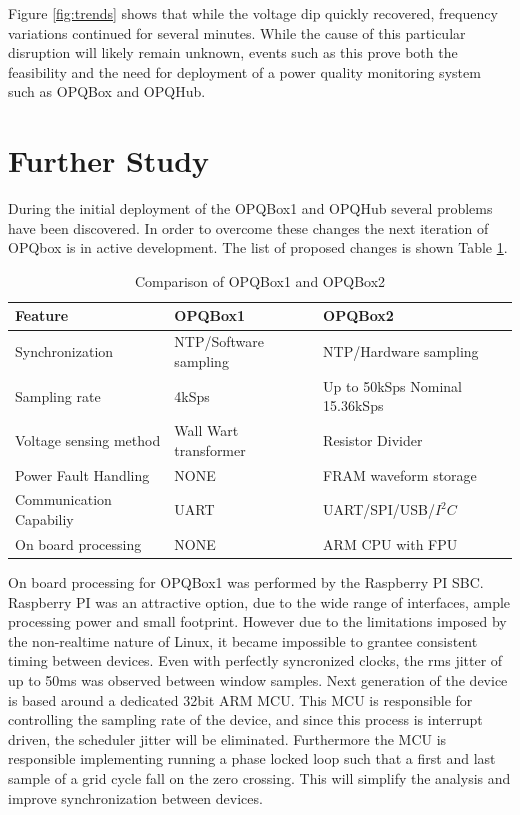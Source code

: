 Figure \ref{fig:trends} shows that while the voltage dip quickly recovered, frequency variations continued for several minutes. While the cause of this particular disruption will likely remain
unknown, events such as this prove both the feasibility and the need for deployment of a power quality monitoring system such as OPQBox and OPQHub.

\section{Further Study}\label{chap:further}

During the initial deployment of the OPQBox1 and OPQHub several problems have been discovered. In order to overcome these changes the next iteration of OPQbox is in active development.
The list of proposed  changes is shown Table \ref{tbl:comp}. 

\begin{table}[h!]
\caption{Comparison of OPQBox1 and OPQBox2}
\label{tbl:comp}
\begin{tabular}{|l|l|l|}
\hline
\textbf{Feature}        & \textbf{OPQBox1}               & \textbf{OPQBox2}                     \\ \hline
Synchronization         & NTP/Software sampling    & NTP/Hardware sampling         				 	\\ \hline
Sampling rate           & 4kSps                 & Up to 50kSps Nominal 15.36kSps 					\\ \hline
Voltage sensing method  & Wall Wart transformer & Resistor Divider            					\\ \hline
Power Fault Handling    & NONE                  & FRAM waveform storage       					\\ \hline
Communication Capabiliy & UART                  & UART/SPI/USB/$I^2C$               					\\ \hline
On board processing     & NONE					& ARM CPU with FPU								\\ \hline
\end{tabular}
\end{table}

On board processing for OPQBox1 was performed by the Raspberry PI SBC. Raspberry PI was an attractive option, due to the wide range of interfaces, ample processing power and small
footprint. However due to the limitations imposed by the non-realtime nature of Linux, it became impossible to grantee consistent timing between devices. Even with perfectly syncronized
clocks, the rms jitter of up to 50ms was observed between window samples. Next generation of the device is based around a dedicated 32bit ARM MCU. This MCU is responsible for controlling
the sampling rate of the device, and since this process is interrupt driven, the scheduler jitter will be eliminated. Furthermore the MCU is responsible implementing running a 
phase locked loop such that a first and last sample of a grid cycle fall on the zero crossing. This will simplify the analysis and improve synchronization between devices.

